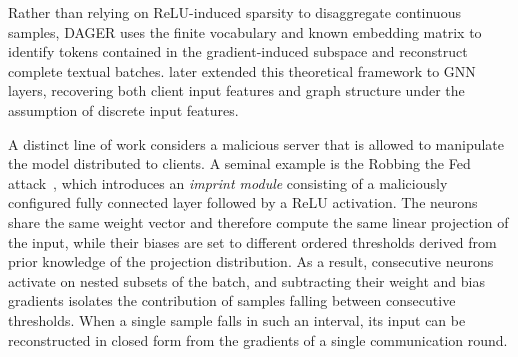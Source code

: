 Rather than relying on ReLU-induced sparsity to disaggregate continuous samples, DAGER uses the finite vocabulary and known embedding matrix to identify tokens contained in the gradient-induced subspace and reconstruct complete textual batches.  later extended this theoretical framework to GNN layers, recovering both client input features and graph structure under the assumption of discrete input features.

A distinct line of work considers a malicious server that is allowed to manipulate the model distributed to clients. A seminal example is the Robbing the Fed attack~\cite{fowlRobbingFedDirectly2021}, which introduces an \emph{imprint module} consisting of a maliciously configured fully connected layer followed by a ReLU activation. The neurons share the same weight vector and therefore compute the same linear projection of the input, while their biases are set to different ordered thresholds derived from prior knowledge of the projection distribution. As a result, consecutive neurons activate on nested subsets of the batch, and subtracting their weight and bias gradients isolates the contribution of samples falling between consecutive thresholds. When a single sample falls in such an interval, its input can be reconstructed in closed form from the gradients of a single communication round.

